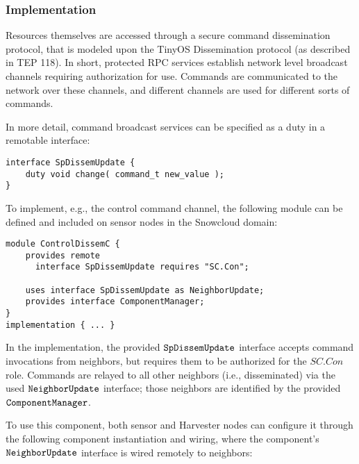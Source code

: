 \subsubsection{Implementation}

Resources themselves are accessed through a secure command dissemination protocol, that is
modeled upon the TinyOS Dissemination protocol (as described in TEP 118). In short, protected
RPC services establish network level broadcast channels requiring authorization for use.
Commands are communicated to the network over these channels, and different channels are used
for different sorts of commands.

In more detail, command broadcast services can be specified as a duty in a remotable interface:

\singlespace
\vspace{1.0ex}
\begin{lstlisting}[language=nesC]
interface SpDissemUpdate {
    duty void change( command_t new_value );
}
\end{lstlisting}
\vspace{1.0ex}
\primaryspacing

To implement, e.g., the control command channel, the following module can be defined and
included on sensor nodes in the Snowcloud domain:

\singlespace
\vspace{1.0ex}
\begin{lstlisting}[language=nesC]
module ControlDissemC {
    provides remote
      interface SpDissemUpdate requires "SC.Con";

    uses interface SpDissemUpdate as NeighborUpdate;
    provides interface ComponentManager;
}
implementation { ... }
\end{lstlisting}
\vspace{1.0ex}
\primaryspacing

In the implementation, the provided $\verb+SpDissemUpdate+$ interface accepts command
invocations from neighbors, but requires them to be authorized for the $\mathit{SC.Con}$ role.
Commands are relayed to all other neighbors (i.e., disseminated) via the used
$\verb+NeighborUpdate+$ interface; those neighbors are identified by the provided
$\verb+ComponentManager+$.

To use this component, both sensor and Harvester nodes can configure it through the following
component instantiation and wiring, where the component's $\verb+NeighborUpdate+$ interface is
wired remotely to neighbors:

